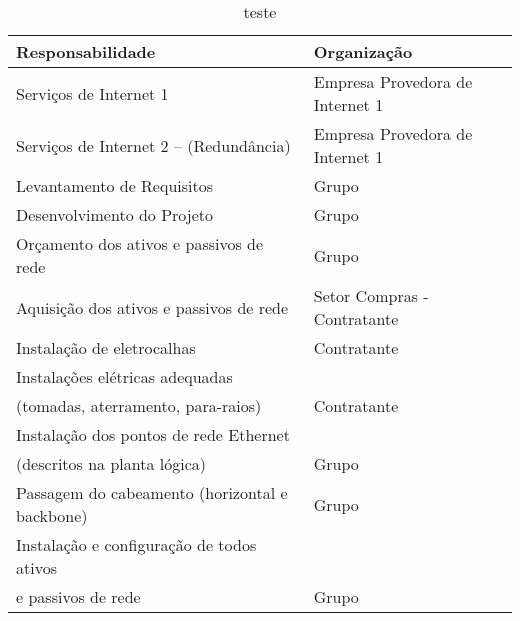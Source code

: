 \begin{table}[h!]
	\centering
	\caption{teste}
	\label{tab4}
	\begin{tabular}{|l|l|}
		\hline
		\textbf{Responsabilidade} & \textbf{Organização} \\ \hline
		Serviços de Internet 1 & Empresa Provedora de Internet 1 \\ \hline
		Serviços de Internet 2 – (Redundância) & Empresa Provedora de Internet 1 \\ \hline
		Levantamento de Requisitos & Grupo \\ \hline
		Desenvolvimento do Projeto & Grupo \\ \hline
		Orçamento dos ativos e passivos de rede & Grupo \\ \hline
		Aquisição dos ativos e passivos de rede & Setor Compras - Contratante \\ \hline
		Instalação de eletrocalhas & Contratante \\ \hline
		Instalações elétricas adequadas\\ 	(tomadas, aterramento, para-raios) & Contratante \\ \hline
		Instalação dos pontos de rede Ethernet\\ (descritos na planta lógica) & Grupo \\ \hline
		Passagem do cabeamento (horizontal e backbone) & Grupo \\ \hline
		Instalação e configuração de todos ativos\\ e passivos de rede & Grupo \\ \hline
	\end{tabular}
\end{table}